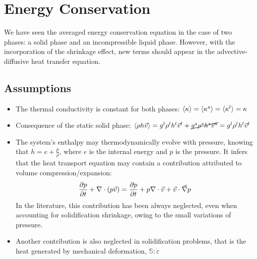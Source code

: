 \section{Energy Conservation}
We have seen the averaged energy conservation equation in the case of two phases: a solid phase and an incompressible liquid phase. However, with the incorporation of the shrinkage effect, new terms should appear
in the advective-diffusive heat transfer equation. 
\subsection{Assumptions}
\begin{itemize}
\item The thermal conductivity is constant for both phases: $\langle \kappa \rangle = \langle \kappa^s \rangle = \langle \kappa^l \rangle= \kappa $ 
\item Consequence of the static solid phase: $\langle \rho h \vec{v} \rangle = {g^l} \rho^l h^l \vec{v}^l +  \cancel{{g^s} \rho^s h^s \vec{v}^s} = {g^l} \rho^l h^l \vec{v}^l$ 
\item The system's enthalpy may thermodynamically evolve with pressure, knowing that $h=e+\frac{p}{\rho}$, where $e$ is the internal energy and $p$ is the pressure. It infers that the heat transport
equation may contain a contribution attributed to volume compression/expansion:
\begin{align}
			 \frac{\partial p}{\partial t}+\nabla \cdot \left( p \vec{v} \right)
			 = \frac{\partial p}{\partial t}+ p \nabla \cdot \vec{v} + \vec{v} \cdot \vec{\nabla} p 
\end{align}
In the literature, this contribution has been always neglected, even when accounting for solidification
shrinkage, owing to the small variations of pressure.
\item Another contribution is also neglected in solidification problems, that is the heat generated by
mechanical deformation, $\mathbb{S}:\dot{\varepsilon}$ 
\end{itemize}
